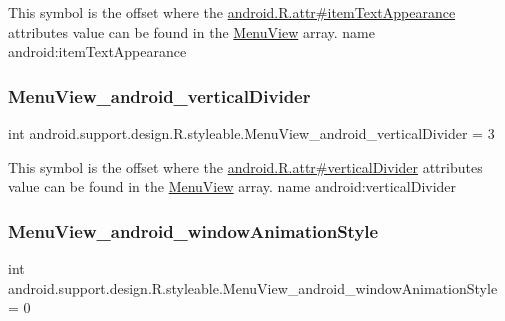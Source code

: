 This symbol is the offset where the \hyperlink{}{android.\+R.\+attr\#item\+Text\+Appearance} attribute\textquotesingle{}s value can be found in the \hyperlink{classandroid_1_1support_1_1design_1_1R_1_1styleable_acaf80b4eb554eab1b6f3b7f929ac7039}{Menu\+View} array.  name android\+:item\+Text\+Appearance \mbox{\label{classandroid_1_1support_1_1design_1_1R_1_1styleable_afadfabc8bd18f617b9220fe44a79d46f}} 
\subsubsection{\texorpdfstring{Menu\+View\+\_\+android\+\_\+vertical\+Divider}{MenuView\_android\_verticalDivider}}
{\footnotesize\ttfamily int android.\+support.\+design.\+R.\+styleable.\+Menu\+View\+\_\+android\+\_\+vertical\+Divider = 3\hspace{0.3cm}{\ttfamily [static]}}

This symbol is the offset where the \hyperlink{}{android.\+R.\+attr\#vertical\+Divider} attribute\textquotesingle{}s value can be found in the \hyperlink{classandroid_1_1support_1_1design_1_1R_1_1styleable_acaf80b4eb554eab1b6f3b7f929ac7039}{Menu\+View} array.  name android\+:vertical\+Divider \mbox{\label{classandroid_1_1support_1_1design_1_1R_1_1styleable_a4e2664155896bc2a2363684e68573525}} 
\subsubsection{\texorpdfstring{Menu\+View\+\_\+android\+\_\+window\+Animation\+Style}{MenuView\_android\_windowAnimationStyle}}
{\footnotesize\ttfamily int android.\+support.\+design.\+R.\+styleable.\+Menu\+View\+\_\+android\+\_\+window\+Animation\+Style = 0\hspace{0.3cm}{\ttfamily [static]}}

